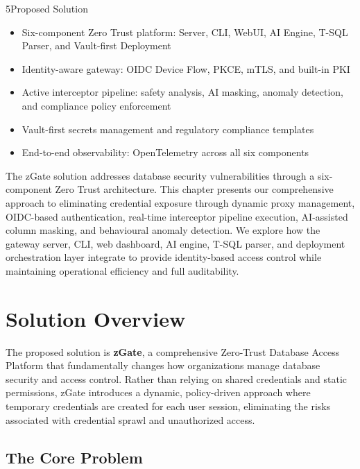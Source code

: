 
\begin{sectionintro}{5}{Proposed Solution}{
  \begin{itemize}[leftmargin=1.5em]
    \item Six-component Zero Trust platform: Server, CLI, WebUI, AI Engine,
          T-SQL Parser, and Vault-first Deployment
    \item Identity-aware gateway: OIDC Device Flow, PKCE, mTLS, and built-in PKI
    \item Active interceptor pipeline: safety analysis, AI masking, anomaly
          detection, and compliance policy enforcement
    \item Vault-first secrets management and regulatory compliance templates
    \item End-to-end observability: OpenTelemetry across all six components
  \end{itemize}
}
The zGate solution addresses database security vulnerabilities through a six-component Zero Trust architecture. This chapter presents our comprehensive approach to eliminating credential exposure through dynamic proxy management, OIDC-based authentication, real-time interceptor pipeline execution, AI-assisted column masking, and behavioural anomaly detection. We explore how the gateway server, CLI, web dashboard, AI engine, T-SQL parser, and deployment orchestration layer integrate to provide identity-based access control while maintaining operational efficiency and full auditability.
\end{sectionintro}

\section{Solution Overview}

The proposed solution is \textbf{zGate}, a comprehensive Zero-Trust Database Access Platform that fundamentally changes how organizations manage database security and access control. Rather than relying on shared credentials and static permissions, zGate introduces a dynamic, policy-driven approach where temporary credentials are created for each user session, eliminating the risks associated with credential sprawl and unauthorized access.

\subsection{The Core Problem}

